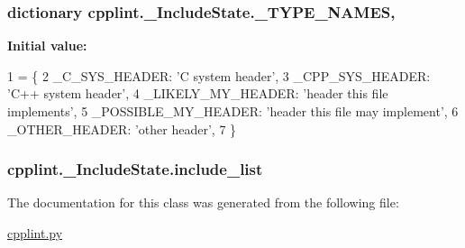 \subsubsection[{\texorpdfstring{\+\_\+\+T\+Y\+P\+E\+\_\+\+N\+A\+M\+ES}{_TYPE_NAMES}}]{\setlength{\rightskip}{0pt plus 5cm}dictionary cpplint.\+\_\+\+Include\+State.\+\_\+\+T\+Y\+P\+E\+\_\+\+N\+A\+M\+ES\hspace{0.3cm}{\ttfamily [static]}, {\ttfamily [private]}}\hypertarget{classcpplint_1_1__IncludeState_a30443aeeaee48abde90a4cf63e6ebda7}{}\label{classcpplint_1_1__IncludeState_a30443aeeaee48abde90a4cf63e6ebda7}
{\bfseries Initial value\+:}
\begin{DoxyCode}
1 = \{
2       \_C\_SYS\_HEADER: \textcolor{stringliteral}{'C system header'},
3       \_CPP\_SYS\_HEADER: \textcolor{stringliteral}{'C++ system header'},
4       \_LIKELY\_MY\_HEADER: \textcolor{stringliteral}{'header this file implements'},
5       \_POSSIBLE\_MY\_HEADER: \textcolor{stringliteral}{'header this file may implement'},
6       \_OTHER\_HEADER: \textcolor{stringliteral}{'other header'},
7       \}
\end{DoxyCode}
\subsubsection[{\texorpdfstring{include\+\_\+list}{include_list}}]{\setlength{\rightskip}{0pt plus 5cm}cpplint.\+\_\+\+Include\+State.\+include\+\_\+list}\hypertarget{classcpplint_1_1__IncludeState_a82d8b92a431437ee181e950517c71cbb}{}\label{classcpplint_1_1__IncludeState_a82d8b92a431437ee181e950517c71cbb}


The documentation for this class was generated from the following file\+:\begin{DoxyCompactItemize}
\item 
\hyperlink{cpplint_8py}{cpplint.\+py}\end{DoxyCompactItemize}
